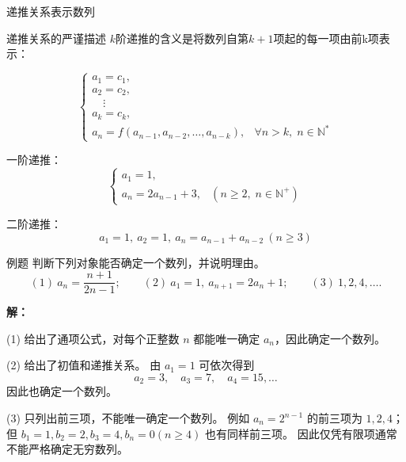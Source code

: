 \documentclass[aspectratio=169,10pt]{ctexbeamer}
\begin{document}
\begin{frame}{递推关系表示数列}
	\small
	\begin{block}{递推关系的严谨描述}
		$k$阶递推的含义是将数列自第$k+1$项起的每一项由前k项表示：
		
		\begin{equation*}
			\begin{cases}
				a_1 = c_1, \\
				a_2 = c_2, \\
				\quad \vdots \\
				a_k = c_k, \\
				a_n = f(a_{n-1}, a_{n-2}, \dots, a_{n-k}), & \forall n > k, \; n \in \mathbb{N}^*
			\end{cases}
		\end{equation*}
	\end{block}
	
		一阶递推：
	\begin{equation*}
		\begin{cases}
			a_1 = 1, \\
			a_n = 2 a_{n-1} + 3, & (n \ge 2, \; n \in \mathbb{N}^+)
		\end{cases}
	\end{equation*}
	
	二阶递推：
	\[
	a_1 = 1,\ a_2 = 1,\ a_n = a_{n-1} + a_{n-2}\ (n \geq 3)
	\]

  
\end{frame}



\begin{frame}
  \begin{block}{例题}
  	判断下列对象能否确定一个数列，并说明理由。
  	\[
  	(1)\ a_n=\frac{n+1}{2n-1};\qquad
  	(2)\ a_1=1,\ a_{n+1}=2a_n+1;\qquad
  	(3)\ 1,2,4,\ldots .
  	\]
  \end{block}
  \pause
  \textbf{解：}
  
    (1) 给出了通项公式，对每个正整数 $n$ 都能唯一确定 $a_n$，因此确定一个数列。
    
    (2) 给出了初值和递推关系。 由 $a_1=1$ 可依次得到
    \[
    a_2=3,\quad a_3=7,\quad a_4=15,\ldots
    \]
    因此也确定一个数列。
    
    (3) 只列出前三项，不能唯一确定一个数列。 例如 $a_n=2^{n-1}$ 的前三项为 $1,2,4$；但 $b_1=1,b_2=2,b_3=4,b_n=0(n\ge4)$ 也有同样前三项。 因此仅凭有限项通常不能严格确定无穷数列。

\end{frame}
\end{document}
